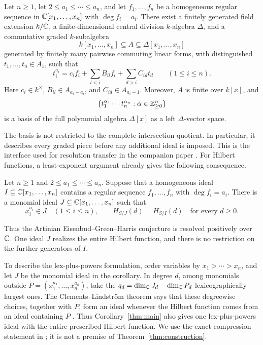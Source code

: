 \begin{theorem}\label{thm:construction}
Let $n\ge1$, let $2\le a_1\le\cdots\le a_n$, and let
$f_1,\ldots,f_n$ be a homogeneous regular sequence in
$\mathbb C[x_1,\ldots,x_n]$ with $\deg f_i=a_i$. There exist a finitely
generated field extension $k/\mathbb C$, a finite-dimensional central division
$k$-algebra $\Delta$, and a commutative graded $k$-subalgebra
\[
 k[x_1,\ldots,x_n]\subseteq A\subseteq\Delta[x_1,\ldots,x_n]
\]
generated by finitely many pairwise commuting linear forms, with
distinguished $t_1,\ldots,t_n\in A_1$, such that
\begin{equation}\label{eq:construction-triangular}
 t_i^{a_i}=c_i f_i+\sum_{l<i}B_{il}f_l+\sum_{d>i}C_{id}t_d
 \qquad(1\le i\le n).
\end{equation}
Here $c_i\in k^\times$, $B_{il}\in A_{a_i-a_l}$, and
$C_{id}\in A_{a_i-1}$. Moreover, $A$ is finite over $k[x]$, and
\[
 \{t_1^{\alpha_1}\cdots t_n^{\alpha_n}:
             \alpha\in\mathbb Z_{\ge0}^n\}
\]
is a basis of the full polynomial algebra $\Delta[x]$ as a left
$\Delta$-vector space.
\end{theorem}

The basis is not restricted to the complete-intersection quotient. In
particular, it describes every graded piece before any additional ideal
is imposed. This is the interface used for resolution transfer in the
companion paper \cite[Lemma~4.1]{BettiCompanion}.
For Hilbert functions, a least-exponent argument already gives the
following consequence.

\begin{corollary}\label{thm:main}
Let $n\ge1$ and $2\le a_1\le\cdots\le a_n$. Suppose that a homogeneous ideal $I\subseteq\mathbb C[x_1,\ldots,x_n]$ contains a regular sequence $f_1,\ldots,f_n$ with $\deg f_i=a_i$. There is a monomial ideal $J\subseteq\mathbb C[x_1,\ldots,x_n]$ such that
\[
 x_i^{a_i}\in J\quad(1\le i\le n),
 \qquad
 H_{S/J}(d)=H_{S/I}(d)\quad\text{for every }d\ge0.
\]
\end{corollary}

Thus the Artinian Eisenbud--Green--Harris conjecture is resolved positively over $\mathbb C$. One ideal $J$ realizes the entire Hilbert function, and there is no restriction on the further generators of $I$.

To describe the lex-plus-powers formulation, order variables by
$x_1>\cdots>x_n$, and let $J$ be the monomial ideal in the corollary.
In degree $d$, among monomials outside
$P=(x_1^{a_1},\ldots,x_n^{a_n})$, take the
$q_d=\dim_\mathbb C J_d-\dim_\mathbb C P_d$ lexicographically largest ones. The
Clements--Lindstr\"om theorem says that these degreewise choices, together
with $P$, form an ideal whenever the Hilbert function comes from an ideal
containing $P$ \cite{CL69}. Thus Corollary~\ref{thm:main} also gives one
lex-plus-powers ideal with the entire prescribed Hilbert function. We use
the exact compression statement in
\cite[Theorem~2.1(i)]{CDS22}; it is not a premise of
Theorem~\ref{thm:construction}.

